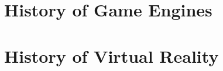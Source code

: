 \newpage
\section{History of Game Engines}
\label{sec:history_game_engines}
\hspace{\parindent}

\newpage
\section{History of Virtual Reality}
\label{sec:history_vr}
\hspace{\parindent}